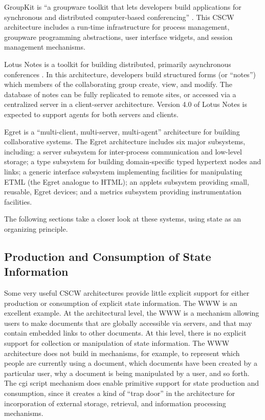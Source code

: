 GroupKit is ``a groupware toolkit that lets developers build applications
for synchronous and distributed computer-based conferencing''
\cite{Roseman95}. This CSCW architecture includes a run-time infrastructure
for process management, groupware programming abstractions, user
interface widgets, and session management mechanisms.

Lotus Notes is a toolkit for building distributed, primarily
asynchronous conferences \cite{LotusNotes}.  In this architecture,
developers build structured forms (or ``notes'') which members of the
collaborating group create, view, and modify.  The database of notes can be fully
replicated to remote sites, or accessed via a centralized server in a
client-server architecture. Version 4.0 of Lotus Notes is expected to
support agents for both servers and clients.

Egret is a ``multi-client, multi-server, multi-agent'' architecture for
building collaborative systems. The Egret architecture
includes six major subsystems, including: a server subsystem for
inter-process communication and low-level storage; a type subsystem for
building domain-specific typed hypertext nodes and links; a generic
interface subsystem implementing facilities for manipulating ETML (the
Egret analogue to HTML); an applets subsystem providing small, reusable,
Egret devices; and a metrics subsystem providing instrumentation facilities.


The following sections take a closer look at these systems, using 
state as an organizing principle.

\subsection{Production and Consumption of State Information} 

Some very useful CSCW architectures provide little explicit support for
either production or consumption of explicit state information.  The WWW is
an excellent example.  At the architectural level, the WWW is
a mechanism allowing users to make documents that are globally
accessible via servers, and that may contain embedded links to other
documents. At this level, there is no explicit support for collection or
manipulation of state information.  The WWW architecture does not build in
mechanisms, for example, to represent which people are currently using a
document, which documents have been created by a particular user, why a
document is being manipulated by a user, and so forth.  The cgi script
mechanism does enable primitive support for state production and
consumption, since it creates a kind of ``trap door'' in the architecture
for incorporation of external storage, retrieval, and information 
processing mechanisms. 

